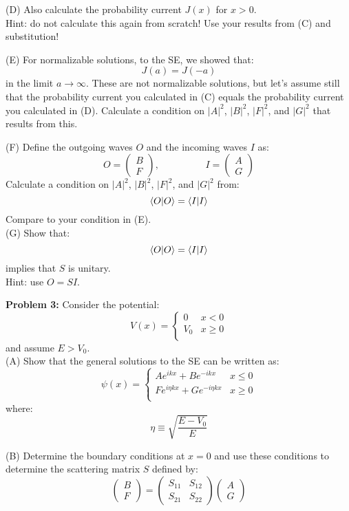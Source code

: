 \documentclass[12pt]{article}
\begin{document}
\noindent
(D) Also calculate the probability current $J(x)$ for $x>0$.\\

\noindent
Hint: do not calculate this again from scratch!  Use your results from (C) and substitution!

\vskip 1cm

\noindent
(E) For normalizable solutions, to the SE, we showed that:
$$J(a) = J(-a)$$
in the limit $a \to \infty$.  These are not normalizable solutions, but let's assume still that the probability current you calculated in (C) equals the probability current you calculated in (D).  Calculate a condition on $|A|^2$, $|B|^2$, $|F|^2$, and $|G|^2$ that results from this.

\noindent
(F) Define the outgoing waves $O$ and the incoming waves $I$ as:
$$O = \begin{pmatrix} B \\ F \end{pmatrix}, \hspace{2cm } I = \begin{pmatrix} A \\ G \end{pmatrix}$$
Calculate a condition on $|A|^2$, $|B|^2$, $|F|^2$, and $|G|^2$ from:
$$\braket{O|O} = \braket{I|I}$$
Compare to your condition in (E).\\

\noindent
(G) Show that:
$$\braket{O|O} = \braket{I|I}$$
implies that $S$ is unitary.\\[5pt]
Hint: use $O = SI$.

\vskip 1cm

\noindent
{\bf Problem 3:}
Consider the potential: 
$$V(x) = \begin{cases}
0   &  x < 0 \\
V_0 &  x \geq 0 \\
\end{cases}
$$
and assume $E>V_0$.\\

\noindent
(A) Show that the general solutions to the SE can be written as:
$$\psi(x) = \begin{cases}
A e^{\displaystyle ikx} + B e^{\displaystyle -ikx} &  x\leq0 \\
F e^{\displaystyle i\eta kx} + G e^{\displaystyle -i \eta kx} &  x\geq0 \\
\end{cases}$$
where:
$$\eta \equiv \sqrt{\frac{E-V_0}{E}}$$

\noindent
(B) Determine the boundary conditions at $x=0$ and use these conditions to determine the scattering matrix $S$ defined by:
$$
\begin{pmatrix} B \\ F \end{pmatrix}
=
\begin{pmatrix} S_{11} & S_{12} \\ S_{21} & S_{22} \end{pmatrix}
\begin{pmatrix} A \\ G \end{pmatrix}
$$\\
\end{document}
